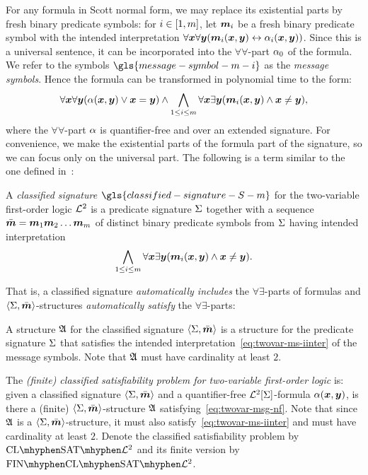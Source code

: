 For any formula in Scott normal form, we may replace its existential parts by
fresh binary predicate symbols: for $i \in [1,m]$, let $\bm{m}_{i}$ be a fresh binary predicate symbol with the intended interpretation $\forall\bm{x}\forall\bm{y} (\bm{m}_{i}(\bm{x},\bm{y}) \leftrightarrow \alpha_{i}(\bm{x},\bm{y}))$.
Since this is a universal sentence, it can be incorporated into the
$\forall\forall$-part $\alpha_{0}$ of the formula.
We refer to the symbols $\gls{message-symbol-m-i}$ as the \emph{message
symbols}.
Hence the formula can be transformed in polynomial time to the form:
\begin{equation}\label{eq:twovar-msg-nf}
  \forall\xx\forall\yy (\falp(\xx,\yy) \lor \xx = \yy) \land
  \bigwedge_{1 \leq \ii \leq \nm} \forall\xx\exists\yy
  (\smm\ii(\xx,\yy) \land \xx \neq \yy),
\end{equation}
where the $\forall\forall$-part $\alpha$ is quantifier-free and over an extended
signature. For convenience, we make the existential parts of the formula part of
the signature, so we can focus only on the universal part. The following is a
term similar to the one defined in~\cite{MALQ:MALQ201400102}:
\begin{definition}
A \emph{classified signature} $\gls{classified-signature-S-m}$ for the
two-variable first-order logic $\mathcal{L}^{2}$ is a predicate signature $\mathrm{\Sigma}$ together
with a sequence $\sms = \smm1\smm2\dots\smm\nm$ of distinct binary predicate
symbols from $\mathrm{\Sigma}$ having intended interpretation
\begin{equation}\label{eq:twovar-ms-iinter}
  \bigwedge_{1 \leq \ii \leq \nm} \forall\xx\exists\yy 
  (\smm\ii(\xx,\yy) \land \xx \neq \yy).
\end{equation}
\end{definition}
That is, a classified signature \emph{automatically includes} the
$\forall\exists$-parts of formulas and $\left\langle \mathrm{\Sigma},\bar{\bm{m}} \right\rangle$-structures
\emph{automatically satisfy} the $\forall\exists$-parts:
\begin{definition}
A structure $\mathfrak{A}$ for the classified signature $\left\langle \mathrm{\Sigma},\bar{\bm{m}} \right\rangle$ is a
structure for the predicate signature $\mathrm{\Sigma}$ that satisfies the intended
interpretation~\cref{eq:twovar-ms-iinter} of the message symbols. Note that
$\mathfrak{A}$ must have cardinality at least $2$.
\end{definition}

\begin{definition}\label{def:clsig-twovar}
The \emph{(finite) classified satisfiability problem for two-variable
first-order logic} is:
given a classified signature $\left\langle \mathrm{\Sigma},\bar{\bm{m}} \right\rangle$ and a quantifier-free
$\mathcal{L}^{2}[\mathrm{\Sigma}]$-formula $\alpha(\bm{x},\bm{y})$, is there a (finite)
$\left\langle \mathrm{\Sigma},\bar{\bm{m}} \right\rangle$-structure $\mathfrak{A}$ satisfying~\cref{eq:twovar-msg-nf}.
Note that since $\mathfrak{A}$ is a $\left\langle \mathrm{\Sigma},\bar{\bm{m}} \right\rangle$-structure, it must also
satisfy~\cref{eq:twovar-ms-iinter} and must have cardinality at least $2$.
Denote the classified satisfiability problem by $\ClSat{\vFo2}$ and its finite
version by $\FinClSat{\vFo2}$.
\end{definition}


